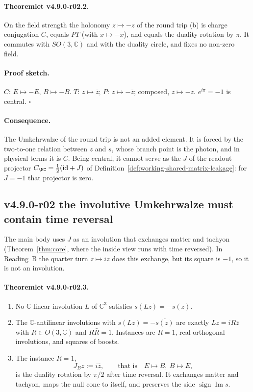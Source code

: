 \paragraph{Theoremlet v4.9.0-r02.2.}
On the field strength the holonomy \(z\mapsto-z\) of the round trip (b) is charge conjugation \(C\), equals \(PT\)
(with \(x\mapsto-x\)), and equals the duality rotation by \(\pi\).  It commutes with \(SO(3,\mathbb C)\) and with the duality
circle, and fixes no non-zero field.

\paragraph{Proof sketch.}
\(C\): \(E\mapsto-E\), \(B\mapsto-B\).  \(T\): \(z\mapsto\bar z\); \(P\): \(z\mapsto-\bar z\); composed, \(z\mapsto-z\).
\(e^{i\pi}=-1\) is central.  \(\square\)

\paragraph{Consequence.}
The Umkehrwalze of the round trip is not an added element.  It is forced by the two-to-one relation between \(z\) and
\(s\), whose branch point is the photon, and in physical terms it is \(C\).  Being central, it cannot serve as the \(J\) of
the readout projector \(C_{\HC}=\tfrac12(\mathrm{id}+J)\) of Definition~\ref{def:working-shared-matrix-leakage}: for
\(J=-1\) that projector is zero.

\subsection*{v4.9.0-r02 the involutive Umkehrwalze must contain time reversal}
\label{subsec:v490-r02-antilinear}

The main body uses \(J\) as an involution that exchanges matter and tachyon (Theorem~\ref{thm:core}, where the inside
view runs with time reversed).  In Reading~B the quarter turn \(z\mapsto iz\) does this exchange, but its square is
\(-1\), so it is not an involution.

\paragraph{Theoremlet v4.9.0-r02.3.}
\begin{enumerate}[leftmargin=2em]
\item[(a)] No \(\mathbb C\)-linear involution \(L\) of \(\mathbb C^3\) satisfies \(s(Lz)=-s(z)\).
\item[(b)] The \(\mathbb C\)-antilinear involutions with \(s(Lz)=-\overline{s(z)}\) are exactly \(Lz=iR\bar z\) with
\(R\in O(3,\mathbb C)\) and \(R\bar R=1\).  Instances are \(R=1\), real orthogonal involutions, and squares of boosts.
\item[(c)] The instance \(R=1\),
\[
J_B z:=i\bar z,\qquad\text{that is}\quad E\mapsto B,\ B\mapsto E,
\]
is the duality rotation by \(\pi/2\) after time reversal.  It exchanges matter and tachyon, maps the null cone to
itself, and preserves the side \(\operatorname{sign}\operatorname{Im}s\).
\end{enumerate}

